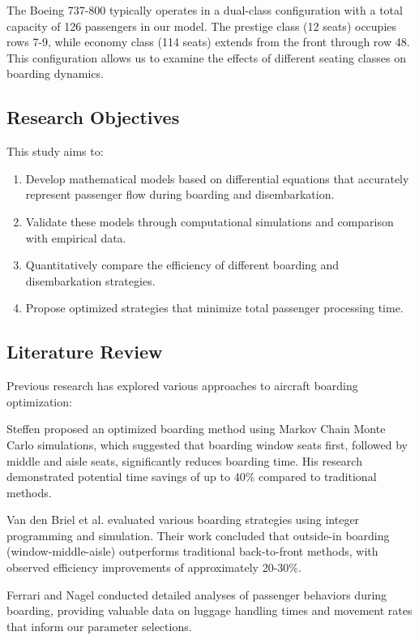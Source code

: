 \documentclass[12pt,a4paper]{article}
\begin{document}
The Boeing 737-800 typically operates in a dual-class configuration with a total capacity of 126 passengers in our model. The prestige class (12 seats) occupies rows 7-9, while economy class (114 seats) extends from the front through row 48. This configuration allows us to examine the effects of different seating classes on boarding dynamics.

\subsection{Research Objectives}
This study aims to:
\begin{enumerate}
    \item Develop mathematical models based on differential equations that accurately represent passenger flow during boarding and disembarkation.
    \item Validate these models through computational simulations and comparison with empirical data.
    \item Quantitatively compare the efficiency of different boarding and disembarkation strategies.
    \item Propose optimized strategies that minimize total passenger processing time.
\end{enumerate}

\subsection{Literature Review}
Previous research has explored various approaches to aircraft boarding optimization:

Steffen \cite{steffen2008} proposed an optimized boarding method using Markov Chain Monte Carlo simulations, which suggested that boarding window seats first, followed by middle and aisle seats, significantly reduces boarding time. His research demonstrated potential time savings of up to 40\% compared to traditional methods.

Van den Briel et al. \cite{vandenbriel2005} evaluated various boarding strategies using integer programming and simulation. Their work concluded that outside-in boarding (window-middle-aisle) outperforms traditional back-to-front methods, with observed efficiency improvements of approximately 20-30\%.

Ferrari and Nagel \cite{ferrari2005} conducted detailed analyses of passenger behaviors during boarding, providing valuable data on luggage handling times and movement rates that inform our parameter selections.
\end{document}
